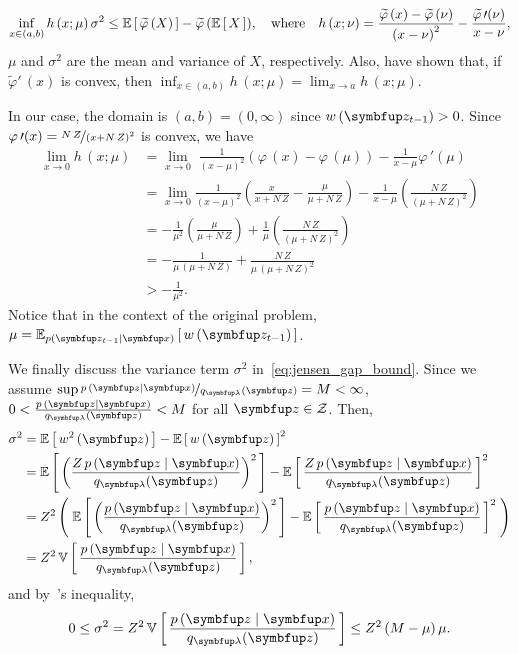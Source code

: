 \begin{proofEnd}
  \begin{align}
    \inf_{x \in (a,b)} h\,(x; \mu) \, \sigma^2
    \leq
    \mathbb{E}\left[\,\widetilde{\varphi}\,(X)\,\right] - \widetilde{\varphi}\,(\mathbb{E}\left[\,X\,\right]),
    \quad \text{where}\quad h\,(x; \nu) = \frac{\widetilde{\varphi}\,(x) - \widetilde{\varphi}\,(\nu)}{{(x - \nu)}^2} - \frac{ \widetilde{\varphi}\,\prime(\nu) }{ x - \nu },\label{eq:jensen_gap_bound}
  \end{align}
\(\mu\) and \(\sigma^2\) are the mean and variance of \(X\), respectively.
Also, \citet[Lemma 1]{liao_sharpening_2019} have shown that, if \(\widetilde{\varphi}\prime\,(x)\) is convex, then \(\inf_{x \in (a,b)} h\,(x; \mu) = \lim_{x \rightarrow a} h\,(x; \mu) \). 

In our case, the domain is \((a,b) = (0, \infty)\) since \(w\,(\vz_{t-1}) > 0\).
Since \(\varphi\,\prime(x) = \nicefrac{N\,Z}{{(x + N\,Z)}^2}\) is convex, we have 
\begin{align}
  \lim_{x \rightarrow 0} h\,(x; \mu)
  &=
  \lim_{x \rightarrow 0} \; \frac{1}{{(x - \mu)}^2} \left( \varphi\,(x) - \varphi\,(\mu) \right)
  - \frac{1}{ x - \mu }  \varphi\,\prime(\mu)  \\
  &=
  \lim_{x \rightarrow 0} \frac{1}{{(x - \mu)}^2}
  \left(
  \frac{x}{x + N\,Z} - \frac{\mu}{\mu + N\,Z}
  \right)
  -
  \frac{1}{x - \mu}
  \left(
  \frac{N\,Z}{ {(\mu + N\,Z)}^2 }
  \right) \\
  &= -\frac{1}{\mu^2} \left( \frac{\mu}{\mu + N\,Z} \right)
  + \frac{1}{\mu} \left( \frac{N\,Z}{{(\mu + N\,Z)}^2} \right) \\
  &= -\frac{1}{ \mu \, (\mu + N\,Z) }
  + \frac{N\,Z}{ \mu \, {(\mu + N\,Z)}^2} \\
  &>- \frac{1}{\mu^2}.
\end{align}
Notice that in the context of the original problem, \(\mu = \Esub{p(\vz_{t-1}\mid\vx)}{ w\,(\vz_{t-1}) }\).

We finally discuss the variance term \(\sigma^2\) in~\eqref{eq:jensen_gap_bound}.
Since we assume \(\sup \nicefrac{p\,(\vz\mid\vx)}{q_{\vlambda}(\vz)} = M < \infty \), \( 0 < \frac{p\,(\vz\mid\vx)}{q_{\vlambda}(\vz)} < M \) for all \(\vz \in \mathcal{Z}\).
Then,
\begin{align}
    \sigma^2 &= \E{w^2\,(\vz)} - {\E{w\,(\vz)}}^2 \\
             &= \E{ {\left( \frac{Z\,p\,(\vz\mid\vx)}{q_{\vlambda}(\vz) } \right)}^2 } - {\E{\frac{Z\,p\,(\vz\mid\vx)}{q_{\vlambda}(\vz) }}}^2 \\
             &= Z^2 \left(\; \E{ {\left( \frac{p\,(\vz\mid\vx)}{q_{\vlambda}(\vz) } \right)}^2 } - {\E{\frac{p\,(\vz\mid\vx)}{q_{\vlambda}(\vz) }}}^2 \;\right) \\
             &= Z^2 \, \V{ \frac{p\,(\vz\mid\vx)}{q_{\vlambda}(\vz) } } ,
\end{align}
and by~\citet{bhatia_better_2000}'s inequality,
\begin{equation}
    0 \leq \sigma^2 
    = Z^2 \, \V{ \frac{p\,(\vz\mid\vx)}{q_{\vlambda}(\vz) } }
    \leq Z^2 \, (M - \mu)\,\mu.
\end{equation}


\end{proofEnd}
